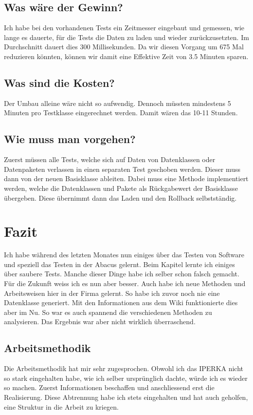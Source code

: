 \subsection{Was wäre der Gewinn?}
Ich habe bei den vorhandenen Tests ein Zeitmesser eingebaut und gemessen, wie lange es dauerte, für die Tests die Daten zu laden und wieder zurückzusetzten. Im Durchschnitt dauert dies 300 Millisekunden. Da wir diesen Vorgang um 675 Mal reduzieren könnten, können wir damit eine Effektive Zeit von 3.5 Minuten sparen. 
\subsection{Was sind die Kosten?}
Der Umbau alleine wäre nicht so aufwendig. Dennoch müssten mindestens 5 Minuten pro Testklasse eingerechnet werden. Damit wären das 10-11 Stunden.
\subsection{Wie muss man vorgehen?}
Zuerst müssen alle Tests, welche sich auf Daten von Datenklassen oder Datenpaketen verlassen in einen separaten Test geschoben werden. Dieser muss dann von der neuen Basisklasse ableiten. Dabei muss eine Methode implementiert werden, welche die Datenklassen und Pakete als Rückgabewert der Basisklasse übergeben. Diese übernimmt dann das Laden und den Rollback selbstständig.

\section{Fazit} \label{Fazit}
Ich habe während des letzten Monates nun einiges über das Testen von Software und speziell das Testen in der Abacus gelernt. Beim Kapitel  lernte ich einiges über saubere Tests. Manche dieser Dinge habe ich selber schon falsch gemacht. Für die Zukunft weiss ich es nun aber besser. Auch habe ich neue Methoden und Arbeitsweisen hier in der Firma gelernt. So habe ich zuvor noch nie eine Datenklasse generiert. Mit den Informationen aus dem Wiki funktionierte dies aber im Nu. So war es auch spannend die verschiedenen Methoden zu analysieren. Das Ergebnis war aber nicht wirklich überraschend.
\subsection{Arbeitsmethodik}
Die Arbeitsmethodik hat mir sehr zugesprochen. Obwohl ich das IPERKA nicht so stark eingehalten habe, wie ich selber ursprünglich dachte, würde ich es wieder so machen. Zuerst Informationen beschaffen und anschliessend erst die Realisierung. Diese Abtrennung habe ich stets eingehalten und hat auch geholfen, eine Struktur in die Arbeit zu kriegen. 
